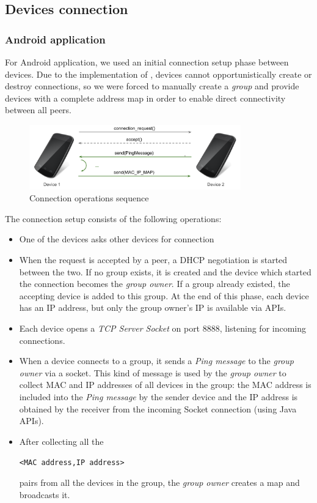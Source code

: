 \subsection{Devices connection}

\subsubsection{Android application}
For Android application, we used an initial connection setup phase between devices.
Due to the implementation of \direct, devices cannot opportunistically create or destroy connections, so we were forced to manually create a \direct \textit{group} and provide devices with a complete address map in order to enable direct connectivity between all peers.

\begin{figure}[!htbp]
\centering
\includegraphics[width=3.6in]{imgs/device_connection_ops.pdf}
\caption{Connection operations sequence}
\label{fig:device_connection}
\end{figure}

The connection setup consists of the following operations:
	\begin{itemize}
		\item One of the devices asks other devices for connection
		\item When the request is accepted by a peer, a DHCP negotiation is started between the two. If no \direct group exists, it is created and the device which started the connection becomes the \textit{group owner}. If a group already existed, the accepting device is added to this group. At the end of this phase, each device has an IP address, but only the group owner's IP is available via \direct APIs. 
		\item Each device opens a \textit{TCP Server Socket} on port 8888, listening for incoming connections.
		\item When a device connects to a group, it sends a \textit{Ping message} to the \textit{group owner} via a socket. This kind of message is used by the \textit{group owner} to collect MAC and IP addresses of all devices in the group: the MAC address is included into the \emph{Ping message} by the sender device and the IP address is obtained by the receiver from the incoming Socket connection (using Java APIs).
		\item After collecting all the \begin{center}\tt{<MAC address,IP address>}\end{center} pairs from all the devices in the group, the \textit{group owner} creates a map and broadcasts it.
	\end{itemize}

